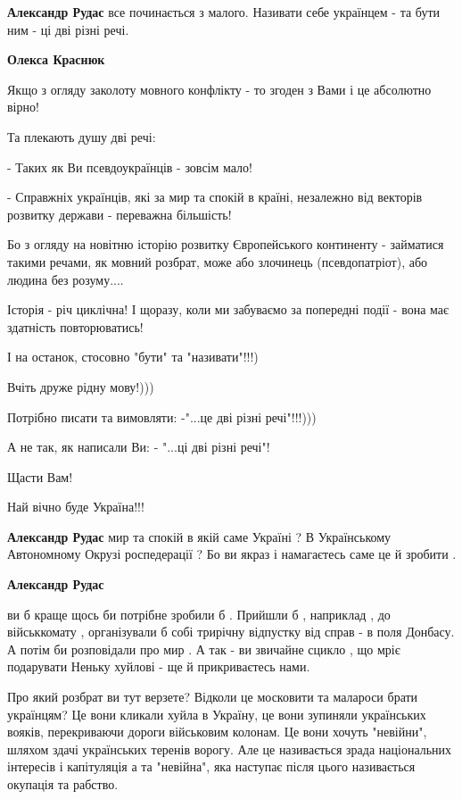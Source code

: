 \begin{itemize}
\begin{itemize}
\textbf{Александр Рудас} все починається з малого. Називати себе українцем - та бути ним - ці дві різні речі.


\textbf{Олекса Краснюк}

Якщо з огляду заколоту мовного конфлікту - то згоден з Вами і це абсолютно
вірно!

Та плекають душу дві речі:

- Таких як Ви псевдоукраїнців - зовсім мало!

- Справжніх українців, які за мир та спокій в країні, незалежно від векторів
розвитку держави - переважна більшість!

Бо з огляду на новітню історію розвитку Європейського континенту - займатися
такими речами, як мовний розбрат, може або злочинець (псевдопатріот), або
людина без розуму....

Історія - річ циклічна! І щоразу, коли ми забуваємо за попередні події - вона
має здатність повторюватись!

І на останок, стосовно "бути" та "називати"!!!)

Вчіть друже рідну мову!)))

Потрібно писати та вимовляти: -"...це дві різні речі"!!!)))

А не так, як написали Ви: - "...ці дві різні речі"!

Щасти Вам!

Най вічно буде Україна!!!

\textbf{Александр Рудас} мир та спокій в якій саме Україні ? В Українському Автономному Окрузі роспедерації ? Бо ви якраз і намагаєтесь саме це й зробити .

\textbf{Александр Рудас} 

ви б краще щось би потрібне зробили б . Прийшли б , наприклад , до військкомату
, організували б собі трирічну відпустку від справ - в поля Донбасу. А потім би
розповідали про мир . А так - ви звичайне сцикло , що мріє подарувати Неньку
хуйлові - ще й прикриваєтесь нами.


Про який розбрат ви тут верзете? Відколи це московити та малароси брати
українцям? Це вони кликали хуйла в Україну, це вони зупиняли українських
вояків, перекриваючи дороги військовим колонам. Це вони хочуть "невійни",
шляхом здачі українських теренів ворогу. Але це називається зрада національних
інтересів і капітуляція а та "невійна", яка наступає після цього називається
окупація та рабство.


\end{itemize}
\end{itemize}
